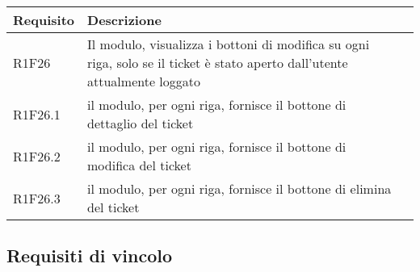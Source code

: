 \pagebreak

\begin{table}[H]
{\renewcommand{\arraystretch}{2}
\begin{tabularx}{\textwidth}{lXl}
\hline\hline
\textbf{Requisito} & \textbf{Descrizione}\\
\hline

R1F26 & Il modulo, visualizza i bottoni di modifica su ogni riga, solo se il ticket è stato aperto dall'utente attualmente loggato \\
\hline
R1F26.1& il modulo, per ogni riga, fornisce il bottone di dettaglio del ticket \\
\hline
R1F26.2 & il modulo, per ogni riga, fornisce il bottone di modifica del ticket \\
\hline
R1F26.3 & il modulo, per ogni riga, fornisce il bottone di elimina del ticket \\
\hline

\end{tabularx}
}
\end{table}

\bigskip

\subsection{Requisiti di vincolo}

